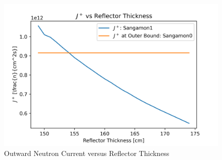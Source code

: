 \begin{figure}[H]
\centering
\includegraphics[width = 12cm]{figures/jout-v-ref.png}
\caption{Outward Neutron Current versus Reflector Thickness}
\label{fig:curr-v-ref}
\end{figure}